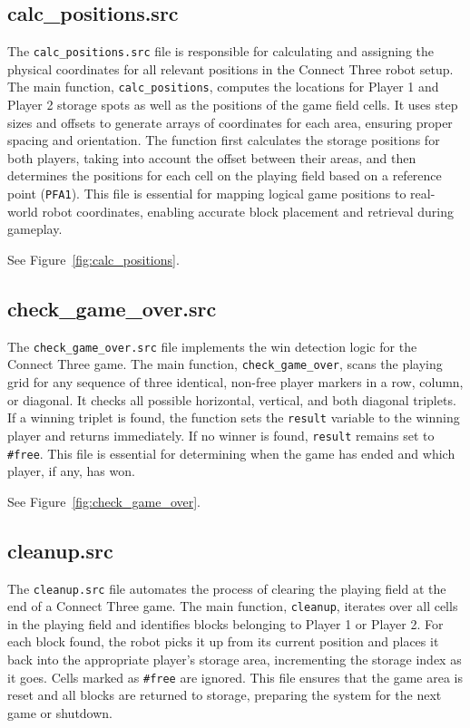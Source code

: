\documentclass{article}
\begin{document}
        \subsection{calc\_positions.src}
            The \texttt{calc\_positions.src} file is responsible for calculating and assigning the physical coordinates for all relevant positions in the Connect Three robot setup. The main function, \texttt{calc\_positions}, computes the locations for Player 1 and Player 2 storage spots as well as the positions of the game field cells. It uses step sizes and offsets to generate arrays of coordinates for each area, ensuring proper spacing and orientation. The function first calculates the storage positions for both players, taking into account the offset between their areas, and then determines the positions for each cell on the playing field based on a reference point (\texttt{PFA1}). This file is essential for mapping logical game positions to real-world robot coordinates, enabling accurate block placement and retrieval during gameplay.

            See Figure~\ref{fig:calc_positions}.

        \subsection{check\_game\_over.src}
            The \texttt{check\_game\_over.src} file implements the win detection logic for the Connect Three game. The main function, \texttt{check\_game\_over}, scans the playing grid for any sequence of three identical, non-free player markers in a row, column, or diagonal. It checks all possible horizontal, vertical, and both diagonal triplets. If a winning triplet is found, the function sets the \texttt{result} variable to the winning player and returns immediately. If no winner is found, \texttt{result} remains set to \texttt{\#free}. This file is essential for determining when the game has ended and which player, if any, has won.

            See Figure~\ref{fig:check_game_over}.

        \subsection{cleanup.src}
            The \texttt{cleanup.src} file automates the process of clearing the playing field at the end of a Connect Three game. The main function, \texttt{cleanup}, iterates over all cells in the playing field and identifies blocks belonging to Player 1 or Player 2. For each block found, the robot picks it up from its current position and places it back into the appropriate player’s storage area, incrementing the storage index as it goes. Cells marked as \texttt{\#free} are ignored. This file ensures that the game area is reset and all blocks are returned to storage, preparing the system for the next game or shutdown.
\end{document}
